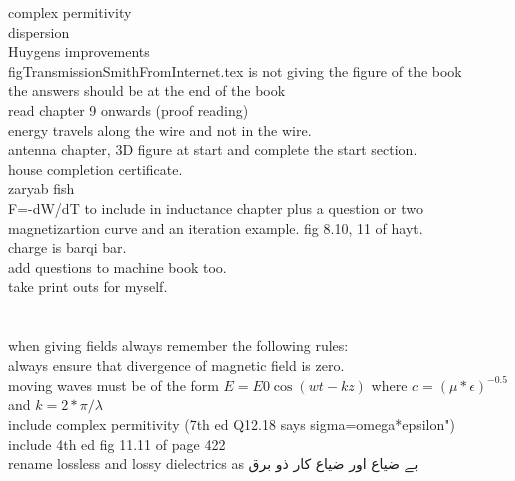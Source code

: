 \begin{otherlanguage}{english}
complex permitivity\\
dispersion\\
Huygens improvements\\
figTransmissionSmithFromInternet.tex is not giving the figure of the book\\
the answers should be at the end of the book\\
read chapter 9 onwards (proof reading)\\
energy travels along the wire and not in the wire.\\
antenna chapter, 3D figure at start and complete the start section.\\
house completion certificate.\\
zaryab fish\\
F=-dW/dT to include in inductance chapter plus a question or two\\
magnetizartion curve and an iteration example. fig 8.10, 11 of hayt.\\
charge is barqi bar.\\
add questions to machine book too.\\
take print outs for myself.\\
\\
\\
when giving fields always remember the following rules:\\
always ensure that divergence of magnetic field is zero.\\
moving waves must be of the form $E=E0 \cos(wt-kz)$ where $c=(\mu*\epsilon)^{-0.5}$ and $k=2*\pi/\lambda$\\
include complex permitivity  (7th ed Q12.18 says sigma=omega*epsilon")\\
include 4th ed fig 11.11 of page 422\\
rename lossless and lossy dielectrics as بے ضیاع اور ضیاع کار ذو برق
\end{otherlanguage}
